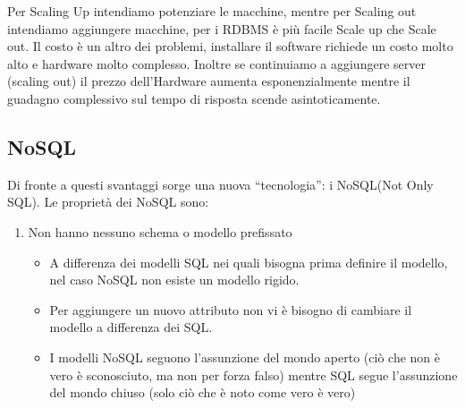 \documentclass[a4page, 11pt]{article}
\begin{document}
Per Scaling Up intendiamo potenziare le macchine, mentre per Scaling out intendiamo aggiungere macchine, per i RDBMS è più facile Scale up che Scale out. 
Il costo è un altro dei problemi, installare il software richiede un costo molto alto e hardware molto complesso.
Inoltre se continuiamo a aggiungere server (scaling out) il prezzo dell'Hardware aumenta esponenzialmente mentre il guadagno complessivo sul tempo di risposta scende asintoticamente.
\newline
\subsection{NoSQL}
Di fronte a questi svantaggi sorge una nuova ``tecnologia'': i NoSQL(Not Only SQL).
Le proprietà dei NoSQL sono:

\begin{enumerate}[noitemsep]
	 
	\item
	Non hanno nessuno schema o modello prefissato
	\begin{itemize}
		
		\item
		A differenza dei modelli SQL nei quali bisogna prima definire il modello, nel caso NoSQL non esiste un modello rigido.
		\item
		Per aggiungere un nuovo attributo non vi è bisogno di cambiare il modello a differenza dei SQL.
		\item
		I modelli NoSQL seguono l'assunzione del mondo aperto (ciò che non è vero è sconosciuto, ma non per forza falso) mentre SQL segue l'assunzione del mondo chiuso (solo ciò che è noto come vero è vero)
	\end{itemize}

	\def\labelenumi{\arabic{enumi}.}
	 

\end{enumerate}
\end{document}
